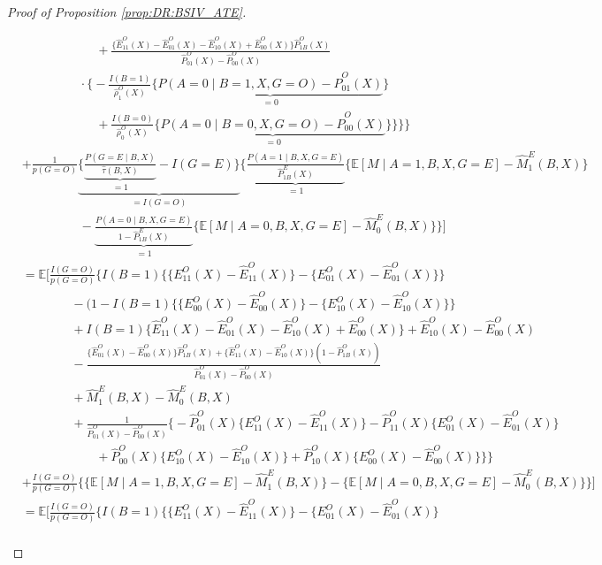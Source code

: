 \documentclass[10pt]{article}
\newcommand{\E}{\mathbb{E}}
\begin{document}
\begin{proof}[Proof of Proposition \ref{prop:DR:BSIV_ATE}]
\begin{itemize}
{\begin{align*}
    &~~~~~~~~~~~~~~~~~~~~~~~~~~~ +\frac{\{\hat{E}_{11}^O(X)-\hat{E}_{01}^O(X)-\hat{E}_{10}^O(X)+\hat{E}_{00}^O(X)\}\hat{P}_{1B}^O(X)}{\hat{P}_{01}^O(X)-\hat{P}_{00}^O(X)}\\
    &~~~~~~~~~~~~~~~~~~~~~\cdot\big\{-\frac{I(B=1)}{\hat{\rho}_1^O(X)}\{\underbrace{P(A=0\mid B=1,X,G=O)-\hat{P}_{01}^O(X)}_{=0}\}\\
    &~~~~~~~~~~~~~~~~~~~~~~~~~~~+\frac{I(B=0)}{\hat{\rho}_0^O(X)}\{\underbrace{P(A=0\mid B=0,X,G=O)-\hat{P}_{00}^O(X)}_{=0}\}\big\}\bigg\}\Bigg\}\\
    &+\frac{1}{p(G=O)}\underbrace{\big\{\underbrace{\frac{P(G=E\mid B,X)}{\hat{\tau}(B,X)}}_{=1}-I(G=E)\big\}}_{=I(G=O)}\bigg\{\underbrace{\frac{P(A=1\mid B,X,G=E)}{\hat{P}_{1B}^E(X)}}_{=1}\{\E[M\mid A=1,B,X,G=E]-\hat{M}_1^E(B,X)\}\\
    &~~~~~~~~~~~~~~~~~~~~~-\underbrace{\frac{P(A=0\mid B,X,G=E)}{1-\hat{P}_{1B}^E(X)}}_{=1}\{\E[M\mid A=0,B,X,G=E]-\hat{M}_0^E(B,X)\}\bigg\}\Big]\\
    &=\E\Big[\frac{I(G=O)}{p(G=O)}\Bigg\{I(B=1)\big\{\{E_{11}^O(X)-\hat{E}_{11}^O(X)\}-\{E_{01}^O(X)-\hat{E}_{01}^O(X)\}\big\}\\
    &\ \ \ \ \ \ \ \ \ \ \ \ \ \ \ \ \ \ -(1-I(B=1)\big\{\{E_{00}^O(X)-\hat{E}_{00}^O(X)\}-\{E_{10}^O(X)-\hat{E}_{10}^O(X)\}\big\}\\
    &\ \ \ \ \ \ \ \ \ \ \ \ \ \ \ \ \ \ +I(B=1)\{\hat{E}_{11}^O(X)-\hat{E}_{01}^O(X)-\hat{E}_{10}^O(X)+\hat{E}_{00}^O(X)\}+\hat{E}_{10}^O(X)-\hat{E}_{00}^O(X)\\
    &\ \ \ \ \ \ \ \ \ \ \ \ \ \ \ \ \ \ -\frac{\{\hat{E}_{01}^O(X)-\hat{E}_{00}^O(X)\}\hat{P}_{1B}^O(X)+\{\hat{E}_{11}^O(X)-\hat{E}_{10}^O(X)\}(1-\hat{P}_{1B}^O(X))}{\hat{P}_{01}^O(X)-\hat{P}_{00}^O(X)}\\
    &\ \ \ \ \ \ \ \ \ \ \ \ \ \ \ \ \ \ +\hat{M}_1^E(B,X)-\hat{M}_0^E(B,X)\\
    &\ \ \ \ \ \ \ \ \ \ \ \ \ \ \ \ \ \ +\frac{1}{\hat{P}_{01}^O(X)-\hat{P}_{00}^O(X)}\bigg\{-\hat{P}_{01}^O(X)\{E_{11}^O(X)-\hat{E}_{11}^O(X)\}-\hat{P}_{11}^O(X)\{E_{01}^O(X)-\hat{E}_{01}^O(X)\}\\
    &~~~~~~~~~~~~~~~~~~~~~~~~~~~+\hat{P}_{00}^O(X)\{E_{10}^O(X)-\hat{E}_{10}^O(X)\}+\hat{P}_{10}^O(X)\{E_{00}^O(X)-\hat{E}_{00}^O(X)\}\bigg\}\Bigg\}\\
    &+\frac{I(G=O)}{p(G=O)}\bigg\{\{\E[M\mid A=1,B,X,G=E]-\hat{M}_1^E(B,X)\}-\{\E[M\mid A=0,B,X,G=E]-\hat{M}_0^E(B,X)\}\bigg\}\Big]\\
    &=\E\Big[\frac{I(G=O)}{p(G=O)}\Bigg\{I(B=1)\Big\{\{E_{11}^O(X)-\hat{E}_{11}^O(X)\}-\{E_{01}^O(X)-\hat{E}_{01}^O(X)\}\\

\end{align*}}
\end{itemize}
\end{proof}
\end{document}
